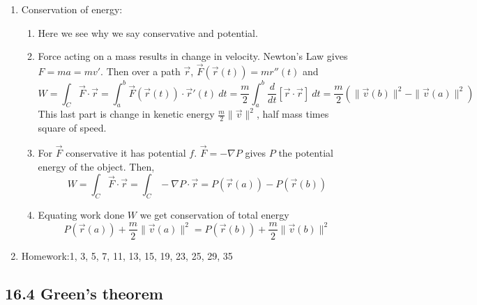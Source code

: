 \documentclass{article}
\begin{document}
\begin{enumerate}
\item Conservation of energy:
\begin{enumerate}
\item Here we see why we say conservative and potential.
\item Force acting on a mass results in change in velocity. Newton's Law gives $F=ma = mv'$. Then over a path $\vec{r}$, $\vec{F}(\vec{r}(t)) = m r''(t)$ and
\[
W = \int_C \vec{F} \cdot \vec{r} = \int_a^b \vec{F}(\vec{r}(t)) \cdot \vec{r}'(t) ~dt = \frac{m}{2} \int_a^b \frac{d}{dt} \left[ \vec{r} \cdot \vec{r} \right] ~dt = \frac{m}{2} \left( \|\vec{v}(b)\|^2 -  \|\vec{v}(a)\|^2 \right)
\]
This last part is change in kenetic energy $\frac{m}{2} \|\vec{v} \|^2$, half mass times square of speed.
\item For $\vec{F}$ conservative it has potential $f$. $\vec{F} = -\nabla P$ gives $P$ the potential energy of the object. Then,
\[
W = \int_C \vec{F} \cdot \vec{r} = \int_C -\nabla P \cdot \vec{r} = P(\vec{r}(a))-P(\vec{r}(b))
\]
\item Equating work done $W$ we get conservation of total energy
\[
P(\vec{r}(a)) + \frac{m}{2} \|\vec{v}(a)\|^2 = P(\vec{r}(b)) + \frac{m}{2} \|\vec{v}(b)\|^2 
\]
\end{enumerate}

\item Homework:1, 3, 5, 7, 11, 13, 15, 19, 23, 25, 29, 35

\end{enumerate}


\subsection{16.4 Green's theorem}
\end{document}

